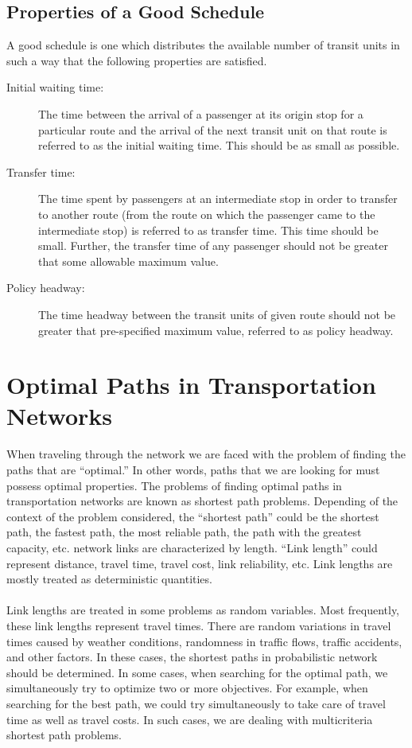 \subsection{Properties of a Good Schedule}
A good schedule is one which distributes the available number of transit units in such a way that the following properties are satisfied.
\begin{description}
	\item [Initial waiting time:] The time between the arrival of a passenger at its origin stop for a particular route and the arrival of the next transit unit on that route is referred to as the initial waiting time. This should be as small as possible.
	\item [Transfer time:] The time spent by passengers at an intermediate stop in order to transfer to another route (from the route on which the passenger came to the intermediate stop) is referred to as transfer time. This time should be small. Further, the transfer time of any passenger should not be greater that some allowable maximum value.
	\item [Policy headway:] The time headway between the transit units of given route should not be greater that pre-specified maximum value, referred to as policy headway.
\end{description}
%
\section{Optimal Paths in Transportation Networks}
When traveling through the network we are faced with the problem of finding the paths that are “optimal.” In other words, paths that we are looking for must possess optimal properties. The problems of finding optimal paths in transportation networks are known as shortest path problems. Depending of the context of the problem considered, the “shortest path” could be the shortest path, the fastest path, the most reliable path, the path with the greatest capacity, etc. network links are characterized by length. “Link length” could represent distance, travel time, travel cost, link reliability, etc. Link lengths are mostly treated as deterministic quantities.\\\\
Link lengths are treated in some problems as random variables. Most frequently, these link lengths represent travel times. There are random variations in travel times caused by weather conditions, randomness in traffic flows, traffic accidents, and other factors. In these cases, the shortest paths in probabilistic network should be determined. In some cases, when searching for the optimal path, we simultaneously try to optimize two or more objectives. For example, when searching for the best path, we could try simultaneously to take care of travel time as well as travel costs. In such cases, we are dealing with multicriteria shortest path problems.
%
